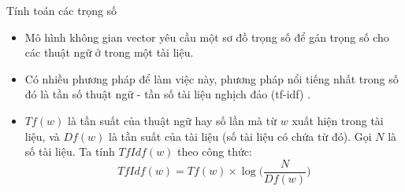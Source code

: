 \documentclass[10pt]{beamer}
\theoremstyle{remark}
\theoremstyle{definition}
\begin{document}
\begin{frame}{Tính toán các trọng số}
	\begin{itemize}
		\item Mô hình không gian vector yêu cầu một sơ đồ trọng số để gán trọng số cho các thuật ngữ ở trong một tài liệu.
		\item Có nhiều phương pháp để làm việc này, phương pháp nổi tiếng nhất trong số đó là tần số thuật ngữ - tần số tài liệu nghịch đảo (tf-idf) \cite{355}.
		\item  $Tf(w)$ là tần suất của thuật ngữ hay số lần mà từ $w$ xuất hiện trong tài liệu, và $Df(w)$ là tần suất của tài liệu (số tài liệu có chứa từ đó).
		Gọi $N$ là số tài liệu. Ta tính $TfIdf(w)$ theo công thức:
		\begin{equation}
			TfIdf(w) = Tf(w) \times \log \Big( \dfrac{N}{Df(w)} \Big)
		\end{equation}
	\end{itemize}
\end{frame}
\end{document}
